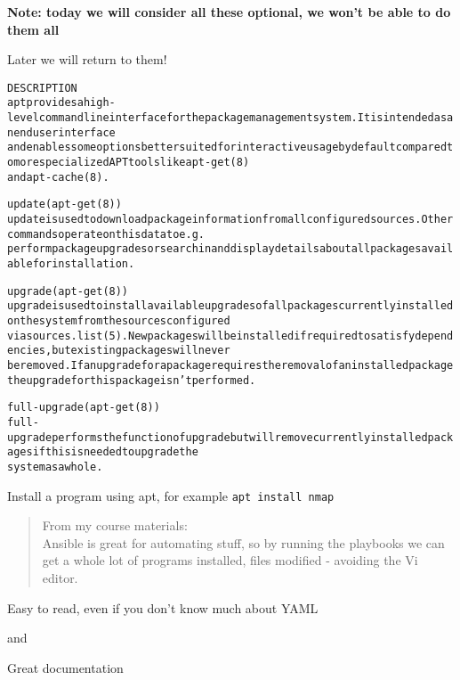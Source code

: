 \documentclass[Screen16to9,17pt]{foils}
\begin{document}
{\bf Note: today we will consider all these optional, we won't be able to do them all}

Later we will return to them!



\begin{alltt}\footnotesize
DESCRIPTION
apt provides a high-level commandline interface for the package management system. It is intended as an end user interface
and enables some options better suited for interactive usage by default compared to more specialized APT tools like apt-get(8)
and apt-cache(8).

update (apt-get(8))
  update is used to download package information from all configured sources. Other commands operate on this data to e.g.
  perform package upgrades or search in and display details about all packages available for installation.

upgrade (apt-get(8))
  upgrade is used to install available upgrades of all packages currently installed on the system from the sources configured
  via sources.list(5). New packages will be installed if required to satisfy dependencies, but existing packages will never
  be removed. If an upgrade for a package requires the removal of an installed package the upgrade for this package isn't performed.

full-upgrade (apt-get(8))
  full-upgrade performs the function of upgrade but will remove currently installed packages if this is needed to upgrade the
  system as a whole.
\end{alltt}

\begin{list2}
  \item Install a program using apt, for example \verb+apt install nmap+
\end{list2}





\begin{quote}
From my course materials:\\
Ansible is great for automating stuff, so by running the playbooks we can get a whole lot of programs installed, files modified - avoiding the Vi editor.
\end{quote}

\begin{list2}
\item Easy to read, even if you don't know much about YAML
\item {} and 
\item Great documentation\\
\end{list2}
\end{document}
